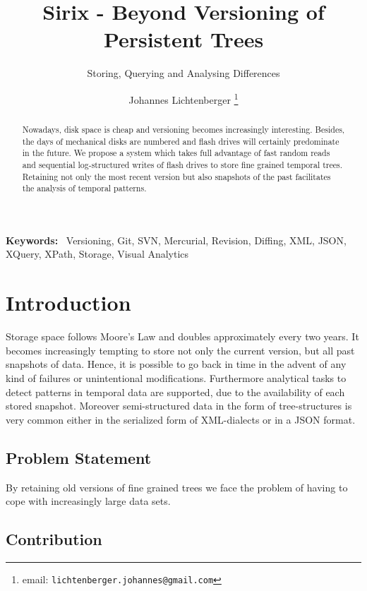 \documentclass[10pt,twoside,a4paper,twocolumn,abstracton]{scrartcl}
\newenvironment{keywords}%
   {\begin{trivlist}\item[]{\bfseries\sffamily Keywords:}\ }
   {\end{trivlist}}
\begin{document}
\title{Sirix - Beyond Versioning of Persistent Trees}
\subtitle{Storing, Querying and Analysing Differences}
\author{Johannes Lichtenberger \thanks{email: \texttt{lichtenberger.johannes@gmail.com}}}

\maketitle

\begin{abstract}
Nowadays, disk space is cheap and versioning becomes increasingly interesting. Besides, the days of mechanical disks are numbered and flash drives will certainly predominate in the future. We propose a system which takes full advantage of fast random reads and sequential log-structured writes of flash drives to store fine grained temporal trees. Retaining not only the most recent version but also snapshots of the past facilitates the analysis of temporal patterns.
\end{abstract}

\begin{keywords}
Versioning, Git, SVN, Mercurial, Revision, Diffing, XML, JSON, XQuery, XPath, Storage, Visual Analytics
\end{keywords}

\section{Introduction}
Storage space follows Moore's Law and doubles approximately every two years. It becomes increasingly tempting to store not only the current version, but all past snapshots of data. Hence, it is possible to go back in time in the advent of any kind of failures or unintentional modifications. Furthermore analytical tasks to detect patterns in temporal data are supported, due to the availability of each stored snapshot. Moreover semi-structured data in the form of tree-structures is very common either in the serialized form of XML-dialects or in a JSON format.

\subsection{Problem Statement}
By retaining old versions of fine grained trees we face the problem of having to cope with increasingly large data sets.
\subsection{Contribution}
\end{document}
